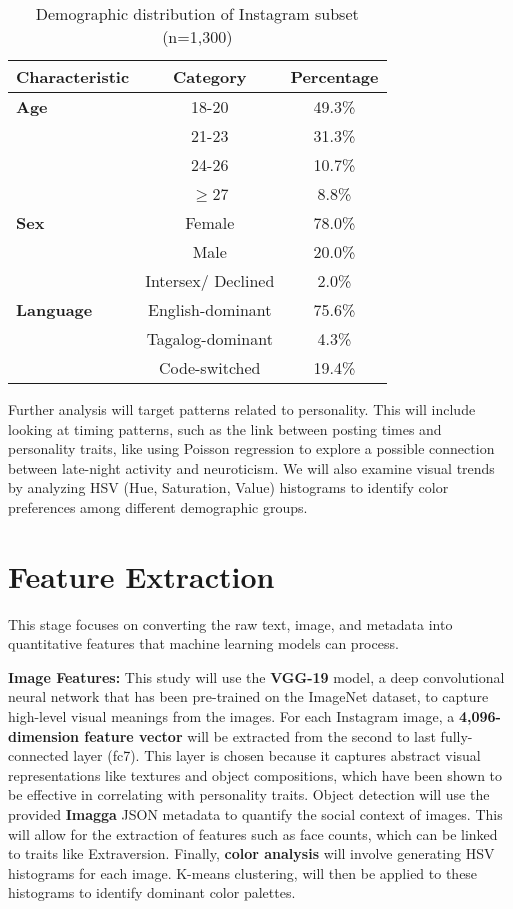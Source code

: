 \begin{table}[h]
	\centering
	\caption{Demographic distribution of Instagram subset (n=1,300)}
	\label{tab:demo}
	\begin{tabular}{lcc}
		\hline
		\textbf{Characteristic} & \textbf{Category} & \textbf{Percentage} \\ \hline
		\textbf{Age} & 18-20 & 49.3\% \\
		& 21-23 & 31.3\% \\
		& 24-26 & 10.7\% \\
		& $\geq$27 & 8.8\% \\ \hline
		\textbf{Sex} & Female & 78.0\% \\
		& Male & 20.0\% \\
		& Intersex/ Declined & 2.0\% \\ \hline
		\textbf{Language} & English-dominant & 75.6\% \\
		& Tagalog-dominant & 4.3\% \\
		& Code-switched & 19.4\% \\ \hline
	\end{tabular}
\end{table}

Further analysis will target patterns related to personality. This will include looking at timing patterns, such as the link between posting times and personality traits, like using Poisson regression to explore a possible connection between late-night activity and neuroticism. We will also examine visual trends by analyzing HSV (Hue, Saturation, Value) histograms to identify color preferences among different demographic groups.


\section{Feature Extraction}
\label{subsec:features}

This stage focuses on converting the raw text, image, and metadata into quantitative features that machine learning models can process. 

\textbf{Image Features:}
This study will use the \textbf{VGG-19} model, a deep convolutional neural network that has been pre-trained on the ImageNet dataset, to capture high-level visual meanings from the images. For each Instagram image, a \textbf{4,096-dimension feature vector} will be extracted from the second to last fully-connected layer (fc7). This layer is chosen because it captures abstract visual representations like textures and object compositions, which have been shown to be effective in correlating with personality traits. Object detection will use the provided \textbf{Imagga} JSON metadata to quantify the social context of images.  This will allow for the extraction of features such as face counts, which can be linked to traits like Extraversion.  Finally, \textbf{color analysis} will involve generating HSV histograms for each image. K-means clustering, will then be applied to these histograms to identify dominant color palettes.

